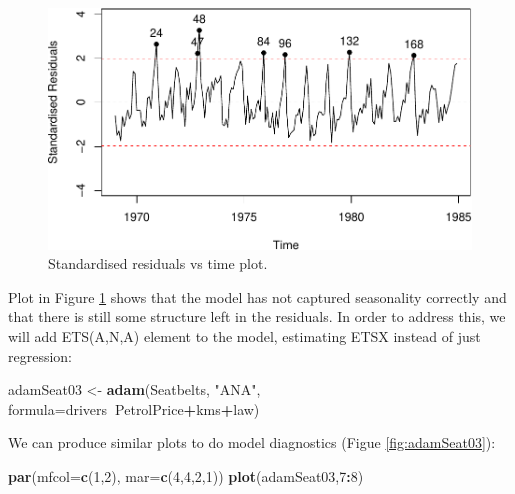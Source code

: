 \documentclass[]{book}
\newenvironment{Shaded}{\begin{snugshade}}{\end{snugshade}}
\newcommand{\DataTypeTok}[1]{\textcolor[rgb]{0.13,0.29,0.53}{#1}}
\newcommand{\DecValTok}[1]{\textcolor[rgb]{0.00,0.00,0.81}{#1}}
\newcommand{\KeywordTok}[1]{\textcolor[rgb]{0.13,0.29,0.53}{\textbf{#1}}}
\newcommand{\NormalTok}[1]{#1}
\newcommand{\OperatorTok}[1]{\textcolor[rgb]{0.81,0.36,0.00}{\textbf{#1}}}
\newcommand{\StringTok}[1]{\textcolor[rgb]{0.31,0.60,0.02}{#1}}
\theoremstyle{definition}
\theoremstyle{definition}
\theoremstyle{definition}
\theoremstyle{definition}
\theoremstyle{remark}
\begin{document}
\begin{figure}
\centering
\includegraphics{Svetunkov--2022----ADAM_files/figure-latex/adamSeat02Resid-1.pdf}
\caption{\label{fig:adamSeat02Resid}Standardised residuals vs time plot.}
\end{figure}

Plot in Figure \ref{fig:adamSeat02Resid} shows that the model has not captured seasonality correctly and that there is still some structure left in the residuals. In order to address this, we will add ETS(A,N,A) element to the model, estimating ETSX instead of just regression:

\begin{Shaded}
\begin{Highlighting}[]
\NormalTok{adamSeat03 <-}\StringTok{ }\KeywordTok{adam}\NormalTok{(Seatbelts, }\StringTok{"ANA"}\NormalTok{,}
                   \DataTypeTok{formula=}\NormalTok{drivers}\OperatorTok{~}\NormalTok{PetrolPrice}\OperatorTok{+}\NormalTok{kms}\OperatorTok{+}\NormalTok{law)}
\end{Highlighting}
\end{Shaded}

We can produce similar plots to do model diagnostics (Figue \ref{fig:adamSeat03}):

\begin{Shaded}
\begin{Highlighting}[]
\KeywordTok{par}\NormalTok{(}\DataTypeTok{mfcol=}\KeywordTok{c}\NormalTok{(}\DecValTok{1}\NormalTok{,}\DecValTok{2}\NormalTok{), }\DataTypeTok{mar=}\KeywordTok{c}\NormalTok{(}\DecValTok{4}\NormalTok{,}\DecValTok{4}\NormalTok{,}\DecValTok{2}\NormalTok{,}\DecValTok{1}\NormalTok{))}
\KeywordTok{plot}\NormalTok{(adamSeat03,}\DecValTok{7}\OperatorTok{:}\DecValTok{8}\NormalTok{)}
\end{Highlighting}
\end{Shaded}
\end{document}
